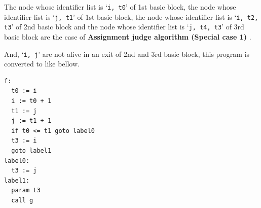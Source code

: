\begin{Example}
The node whose identifier list is `{\tt{i, t0}}' of 1st basic block,
the node whose identifier list is `{\tt{j, t1}}' of 1st basic block,
the node whose identifier list is `{\tt{i, t2, t3}}' of 2nd basic block
and the node whose identifier list is `{\tt{j, t4, t3}}' of 3rd basic block
are the case of {\bf Assignment judge algorithm (Special case 1) }.

And, `{\tt{i, j}}' are not alive in an exit of 2nd and 3rd basic block,
this program is converted to like bellow.
\begin{verbatim}
f:
  t0 := i
  i := t0 + 1
  t1 := j
  j := t1 + 1
  if t0 <= t1 goto label0
  t3 := i
  goto label1
label0:
  t3 := j
label1:
  param t3
  call g
\end{verbatim}
\end{Example}

\begin{Example}
\label{optimize_e103}
\begin{verbatim}


\end{verbatim}
\end{Example}
